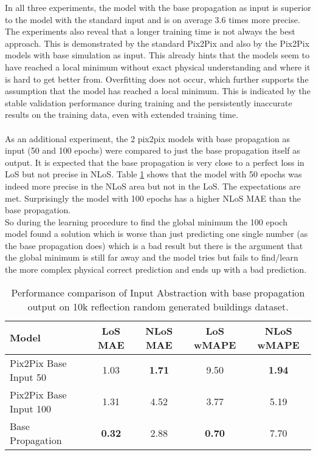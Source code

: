 		In all three experiments, the model with the base propagation as input is superior to the model with the standard input and is on average 3.6 times more precise.\\
		The experiments also reveal that a longer training time is not always the best approach. This is demonstrated by the standard Pix2Pix and also by the Pix2Pix models with base simulation as input. This already hints that the models seem to have reached a local minimum without exact physical understanding and where it is hard to get better from. Overfitting does not occur, which further supports the assumption that the model has reached a local minimum. This is indicated by the stable validation performance during training and the persistently inaccurate results on the training data, even with extended training time.\\ 
		\\
		As an additional experiment, the 2 pix2pix models with base propagation as input (50 and 100 epochs) were compared to just the base propagation itself as output. It is expected that the base propagation is very close to a perfect loss in LoS but not precise in NLoS. Table \ref{tab:performance_input_base} shows that the model with 50 epochs was indeed more precise in the NLoS area but not in the LoS. The expectations are met. Surprisingly the model with 100 epochs has a higher NLoS MAE than the base propagation.\\
		So during the learning procedure to find the global minimum the 100 epoch model found a solution which is worse than just predicting one single number (as the base propagation does) which is a bad result but there is the argument that the global minimum is still far away and the model tries but fails to find/learn the more complex physical correct prediction and ends up with a bad prediction.
		\begin{table}[h!]
			\centering
			\begin{tabular}{|l|c|c|c|c|}
				\hline
				\textbf{Model} & \textbf{LoS MAE} & \textbf{NLoS MAE} & \textbf{LoS wMAPE} & \textbf{NLoS wMAPE} \\
				\hline
				Pix2Pix Base Input 50 & 1.03 & \textbf{1.71} & 9.50 & \textbf{1.94} \\
				Pix2Pix Base Input 100 & 1.31 & 4.52 & 3.77 & 5.19 \\
				Base Propagation & \textbf{0.32} & 2.88 & \textbf{0.70} & 7.70 \\
				\hline
			\end{tabular}
			\caption{Performance comparison of Input Abstraction with base propagation output on 10k reflection random generated buildings dataset.}
			\label{tab:performance_input_base}
		\end{table}
